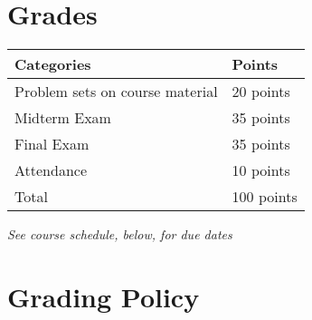 \documentclass[12pt]{article}
\begin{document}
\newpage

\section*{Grades}

\newlength\q
\setlength{}
\begin{tabular}{|p{\q}|p{\q}|}
    \hline
    Categories  & Points \\
    \hline
    \hline
    Problem sets on course material   & 20 points \\
    \hline
    Midterm Exam & 35 points \\
    \hline
    Final Exam & 35 points \\
    \hline
    Attendance & 10 points \\
    \hline
    Total & 100 points \\
    \hline
\end{tabular}
\textit{See course schedule, below, for due dates}


\section*{Grading Policy}





\end{document}
